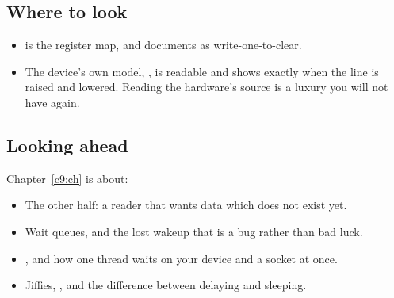 \subsection*{Where to look}
\begin{itemize}
  \item {} is the register map, and documents  as
    write-one-to-clear.
  \item The device's own model, , is readable and shows exactly when the
    line is raised and lowered. Reading the hardware's source is a luxury you will not have again.
\end{itemize}

\subsection*{Looking ahead}
Chapter~\ref{c9:ch} is about:
\begin{itemize}
  \item The other half: a reader that wants data which does not exist yet.
  \item Wait queues, and the lost wakeup that is a bug rather than bad luck.
  \item {}, and how one thread waits on your device and a socket at once.
  \item Jiffies, , and the difference between delaying and sleeping.
\end{itemize}
